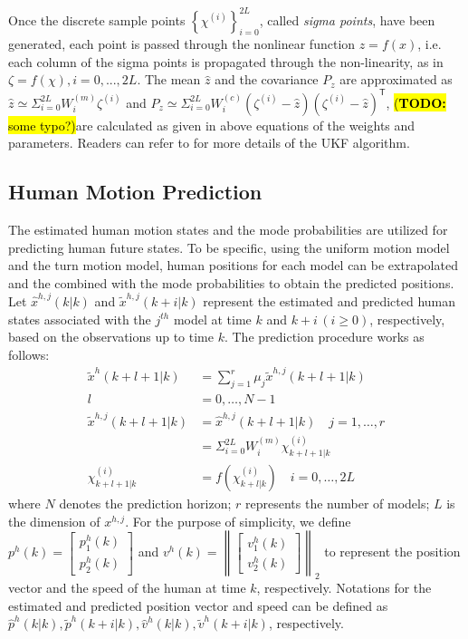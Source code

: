 \documentclass[letterpaper, 10 pt, conference]{ieeeconf}
\newcommand{\todohere}[1]{\hl{(\textbf{TODO:} #1)}}
\begin{document}
	Once the discrete sample points $\left\{\chi^{(i)} \right\}_{i=0}^{2L}$, called \textit{sigma points}, have been generated, each point is passed through the nonlinear function $z=f(x)$, i.e. each column of the sigma points is propagated through the non-linearity, as in $\zeta=f(\chi), i=0,...,2L$. The mean $\hat{z}$ and the covariance $P_z$ are approximated as $\hat{z}\simeq \Sigma_{i=0}^{2L}W_i^{(m)} \zeta^{(i)}$ and $P_z \simeq  \Sigma_{i=0}^{2L}W_i^{(c)}(\zeta^{(i)}-\hat{z})(\zeta^{(i)}-\hat{z})^\mathsf{T}$, \todohere{some typo?}are calculated as given in above equations of the weights and parameters\cite{Hong}. Readers can refer to \cite {KalmanFiltering} for more details of the UKF algorithm. 
	
	\subsection{Human Motion Prediction}\label{subsec:motion_pred}
	The estimated human motion states and the mode probabilities are utilized for predicting human future states.
	To be specific, using the uniform motion model and the turn motion model, human positions for each model can be extrapolated and the combined with the mode probabilities to obtain the predicted positions.
	Let $\hat{x}^{h,j}(k|k)$ and $\tilde{x}^{h,j}(k+i|k)$ represent the estimated and predicted human states associated with the $j^{th}$ model at time $k$ and $k+i\,(i\ge 0)$, respectively, based on the observations up to time $k$.
	The prediction procedure works as follows:
	\begin{subequations}\label{eqn:motion_pred_imm}
		\begin{align}
		\tilde{x}^h(k+l+1|k)&=\sum\limits_{j=1}^{r}\mu_j \tilde{x}^{h,j}(k+l+1|k)\\ l&=0,\dots,N-1\\
		\tilde{x}^{h,j}(k+l+1|k)&=\hat{x}^{h,j}(k+l+1|k) \quad j=1,\dots, r\\
		&=\Sigma_{i=0}^{2L}W_i^{(m)} \chi_{k+l+1|k}^{(i)} \\
		\chi_{k+l+1|k}^{(i)}&=f(\chi_{k+l|k}^{(i)}) \quad i=0,\dots, 2L
		\end{align}
	\end{subequations}
	where $N$ denotes the prediction horizon; $r$ represents the number of models; $L$ is the dimension of $x^{h,j}$.
	For the purpose of simplicity, we define $p^h(k)=
	\left[ 
	\begin{array}{c}
	p^h_1(k)\\
	p^h_2(k)
	\end{array}\right] $ and $v^h(k)=
	\left\|\left[ 
	\begin{array}{c}
	v^h_1(k)\\
	v^h_2(k)
	\end{array}\right]\right\|_2
	$ to represent the position vector and the speed of the human at time $k$, respectively.
	Notations for the estimated and predicted position vector and speed can be defined as $\hat{p}^h(k|k),\tilde{p}^h(k+i|k),\hat{v}^h(k|k),\tilde{v}^h(k+i|k)$, respectively.
	
\end{document}
